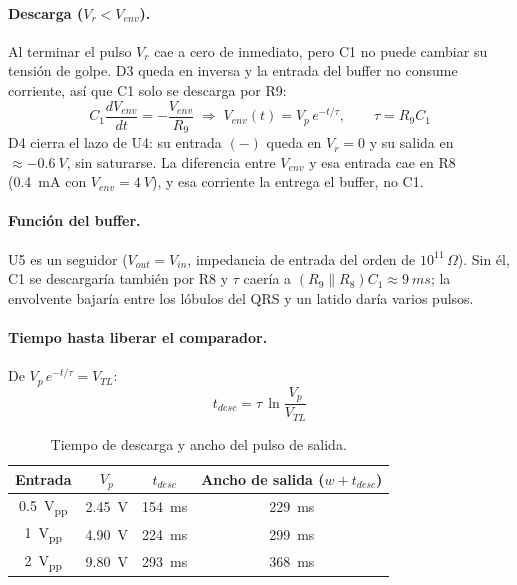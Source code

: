 \documentclass[11pt,letterpaper]{article}
\newcommand{\Vr}{V_r}
\newcommand{\Venv}{V_{env}}
\newcommand{\VTL}{V_{TL}}
\begin{document}
\paragraph{Descarga ($\Vr<\Venv$).} Al terminar el pulso $\Vr$ cae a cero de inmediato, pero C1 no puede cambiar su tensión de golpe. D3 queda en inversa y la entrada del buffer no consume corriente, así que C1 solo se descarga por R9:
\begin{equation}
C_1\frac{d\Venv}{dt}=-\frac{\Venv}{R_9}\;\Rightarrow\;\Venv(t)=V_p\,e^{-t/\tau},\qquad \tau=R_9C_1
\label{eq:descarga}
\end{equation}
D4 cierra el lazo de U4: su entrada $(-)$ queda en $\Vr=0$ y su salida en $\approx-\SI{0,6}{V}$, sin saturarse. La diferencia entre $\Venv$ y esa entrada cae en R8 (\SI{0,4}{mA} con $\Venv=\SI{4}{V}$), y esa corriente la entrega el buffer, no C1.

\paragraph{Función del buffer.} U5 es un seguidor ($V_{out}=V_{in}$, impedancia de entrada del orden de $10^{11}\,\Omega$). Sin él, C1 se descargaría también por R8 y $\tau$ caería a $(R_9\parallel R_8)C_1\approx\SI{9}{ms}$; la envolvente bajaría entre los lóbulos del QRS y un latido daría varios pulsos.

\paragraph{Tiempo hasta liberar el comparador.} De $V_p\,e^{-t/\tau}=\VTL$:
\begin{equation}
t_{desc}=\tau\,\ln\frac{V_p}{\VTL}
\label{eq:tdesc}
\end{equation}

\begin{table}[H]
\centering
\caption{Tiempo de descarga y ancho del pulso de salida.}\label{tab:tdesc}
\begin{tabular}{@{}cccc@{}}
\toprule
Entrada & $V_p$ & $t_{desc}$ & Ancho de salida ($w+t_{desc}$) \\
\midrule
\SI{0,5}{V_{pp}} & \SI{2,45}{V} & \SI{154}{ms} & \SI{229}{ms} \\
\SI{1}{V_{pp}} & \SI{4,90}{V} & \SI{224}{ms} & \SI{299}{ms} \\
\SI{2}{V_{pp}} & \SI{9,80}{V} & \SI{293}{ms} & \SI{368}{ms} \\
\bottomrule
\end{tabular}
\end{table}
\end{document}
